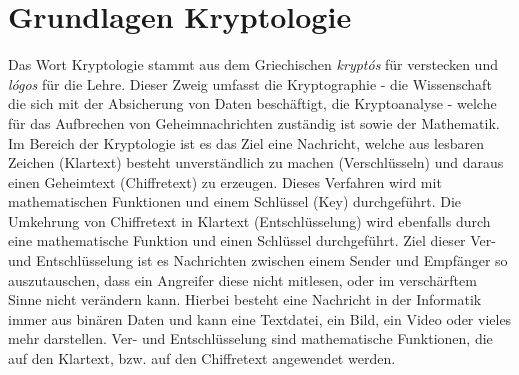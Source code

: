 \documentclass[10pt, a4paper]{scrreprt}
\begin{document}
\chapter{Grundlagen Kryptologie}
Das Wort Kryptologie stammt aus dem Griechischen \textit{kryptós} für verstecken und \textit{lógos} für die Lehre.%
Dieser Zweig umfasst die Kryptographie - die Wissenschaft die sich mit der Absicherung von Daten beschäftigt, die Kryptoanalyse - welche für das Aufbrechen von Geheimnachrichten zuständig ist sowie der Mathematik.
Im Bereich der Kryptologie ist es das Ziel eine Nachricht, welche aus lesbaren Zeichen (Klartext) besteht unverständlich zu machen (Verschlüsseln) und daraus einen Geheimtext (Chiffretext) zu erzeugen. Dieses Verfahren wird mit mathematischen Funktionen und einem Schlüssel (Key) durchgeführt. Die Umkehrung von Chiffretext in Klartext (Entschlüsselung) wird ebenfalls durch eine mathematische Funktion und einen Schlüssel durchgeführt. Ziel dieser Ver- und Entschlüsselung ist es Nachrichten zwischen einem Sender und Empfänger so auszutauschen, dass ein Angreifer diese nicht mitlesen, oder im verschärftem Sinne nicht verändern kann. Hierbei besteht eine Nachricht in der Informatik immer aus binären Daten und kann eine Textdatei, ein Bild, ein Video oder vieles mehr darstellen. Ver- und Entschlüsselung sind mathematische Funktionen, die auf den Klartext, bzw. auf den Chiffretext angewendet werden. 
\end{document}
